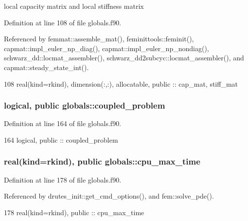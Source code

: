 local capacity matrix and local stiffness matrix 



Definition at line 108 of file globals.\+f90.



Referenced by femmat\+::assemble\+\_\+mat(), feminittools\+::feminit(), capmat\+::impl\+\_\+euler\+\_\+np\+\_\+diag(), capmat\+::impl\+\_\+euler\+\_\+np\+\_\+nondiag(), schwarz\+\_\+dd\+::locmat\+\_\+assembler(), schwarz\+\_\+dd2subcyc\+::locmat\+\_\+assembler(), and capmat\+::steady\+\_\+state\+\_\+int().


\begin{DoxyCode}
108   \textcolor{keywordtype}{real(kind=rkind)}, \textcolor{keywordtype}{dimension(:,:)}, \textcolor{keywordtype}{allocatable}, \textcolor{keywordtype}{public} :: cap_mat, stiff_mat
\end{DoxyCode}
\subsubsection[{coupled\+\_\+problem}]{\setlength{\rightskip}{0pt plus 5cm}logical, public globals\+::coupled\+\_\+problem}\label{namespaceglobals_a46b207ec976261c6b4256183224c6e5f}


Definition at line 164 of file globals.\+f90.


\begin{DoxyCode}
164   \textcolor{keywordtype}{logical}, \textcolor{keywordtype}{public} :: coupled_problem
\end{DoxyCode}
\subsubsection[{cpu\+\_\+max\+\_\+time}]{\setlength{\rightskip}{0pt plus 5cm}real(kind=rkind), public globals\+::cpu\+\_\+max\+\_\+time}\label{namespaceglobals_a969b0d7935a884135f6709a2e26cec56}


Definition at line 178 of file globals.\+f90.



Referenced by drutes\+\_\+init\+::get\+\_\+cmd\+\_\+options(), and fem\+::solve\+\_\+pde().


\begin{DoxyCode}
178   \textcolor{keywordtype}{real(kind=rkind)}, \textcolor{keywordtype}{public} :: cpu_max_time
\end{DoxyCode}
